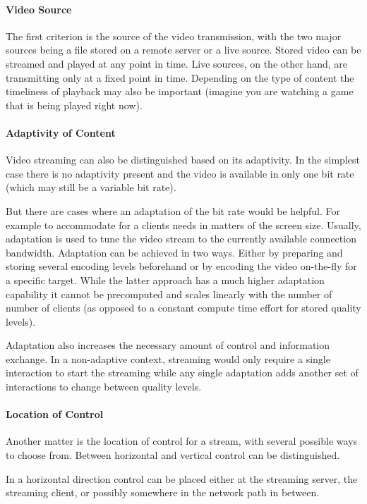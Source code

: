 \paragraph{Video Source}
The first criterion is the source of the video transmission, with the two major sources being a file stored on a remote server or a live source. Stored video can be streamed and played at any point in time. Live sources, on the other hand, are transmitting only at a fixed point in time. Depending on the type of content the timeliness of playback may also be important (imagine you are watching a game that is being played right now).


\paragraph{Adaptivity of Content}
Video streaming can also be distinguished based on its adaptivity. In the simplest case there is no adaptivity present and the video is available in only one bit rate (which may still be a variable bit rate). 

But there are cases where an adaptation of the bit rate would be helpful. For example to accommodate for a clients needs in matters of the screen size. Usually, adaptation is used to tune the video stream to the currently available connection bandwidth. Adaptation can be achieved in two ways. Either by preparing and storing several encoding levels beforehand or by encoding the video on-the-fly for a specific target. While the latter approach has a much higher adaptation capability it cannot be precomputed and scales linearly with the number of  number of clients (as opposed to a constant compute time effort for stored quality levels).

Adaptation also increases the necessary amount of control and information exchange. In a non-adaptive context, streaming would only require a single interaction to start the streaming while any single adaptation adds another set of interactions to change between quality levels.


\paragraph{Location of Control}
Another matter is the location of control for a stream, with several possible ways to choose from. Between horizontal and vertical control can be distinguished.

In a horizontal direction control can be placed either at the streaming server, the streaming client, or possibly somewhere in the network path in between.

